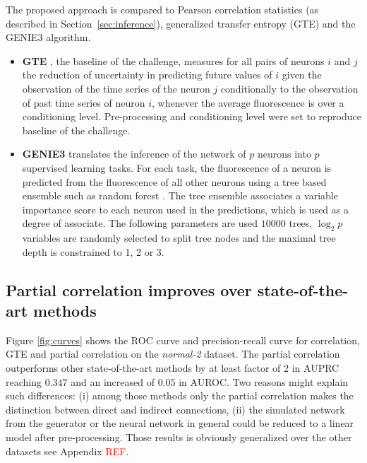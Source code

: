 \documentclass[wcp]{jmlr}
\begin{document}
The proposed approach is compared to Pearson correlation statistics (as
described in Section~\ref{sec:inference}), generalized transfer entropy (GTE)
and the GENIE3 algorithm.
\begin{itemize}
\item \textbf{GTE} \citep{stetter2012model}, the baseline of the challenge, measures for all pairs of
neurons $i$ and $j$ the reduction of uncertainty in predicting future values of
$i$ given the observation of the time series of the neuron $j$
conditionally to the observation of past time series of neuron $i$,
whenever the average fluorescence is over a conditioning level.
Pre-processing and conditioning level were set to reproduce baseline of the
challenge.

\item \textbf{GENIE3} \citep{huynhthu2010inferring} translates the inference of the
network of $p$ neurons into $p$ supervised learning tasks. For each task,
the fluorescence of a neuron is predicted from the fluorescence
of all other neurons using a tree based ensemble such as
random forest \citep{breiman2001random}. The tree ensemble associates a
variable importance score \citep{louppe2013understanding}
to each neuron used in the predictions, which is used as a degree of associate. The following parameters are used
$10000$ trees, $\log_2{p}$ variables are randomly selected to split tree
nodes and the maximal tree depth is constrained to 1, 2 or 3.
\end{itemize}


\subsection*{Partial correlation improves over state-of-the-art methods}

Figure \ref{fig:curves} shows the ROC curve  and precision-recall curve
for correlation, GTE and partial correlation on the \textit{normal-2}
dataset. The partial correlation outperforms other state-of-the-art methods
by at least factor of 2 in AUPRC reaching $0.347$ and an increased of $0.05$ in
AUROC. Two reasons might explain such differences: (i) among
those methods only the partial correlation makes the distinction between
direct and indirect connections, (ii) the simulated network from the
\citep{stetter2012model} generator or the neural network in general could be
reduced to a linear model after pre-processing. Those results is obviously
generalized over the other datasets see Appendix \textcolor{red}{REF}.
\end{document}
